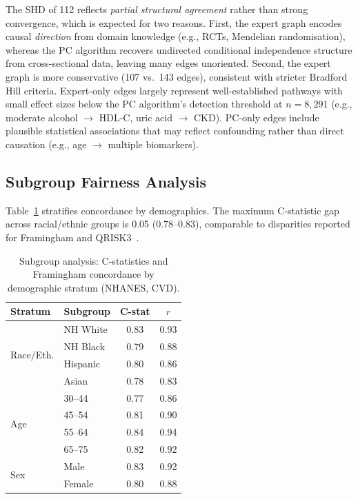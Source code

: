 \documentclass[runningheads]{llncs}
\begin{document}
The SHD of 112 reflects \emph{partial structural agreement} rather
than strong convergence, which is expected for two reasons.  First,
the expert graph encodes causal \emph{direction} from domain knowledge
(e.g., RCTs, Mendelian randomisation), whereas the PC algorithm
recovers undirected conditional independence structure from
cross-sectional data, leaving many edges unoriented.  Second, the
expert graph is more conservative (107 vs.\ 143 edges), consistent
with stricter Bradford Hill criteria.  Expert-only edges largely
represent well-established pathways with small effect sizes below the
PC algorithm's detection threshold at $n = 8{,}291$ (e.g., moderate
alcohol $\rightarrow$ HDL-C, uric acid $\rightarrow$ CKD).  PC-only
edges include plausible statistical associations that may reflect
confounding rather than direct causation (e.g., age $\rightarrow$
multiple biomarkers).

\subsection{Subgroup Fairness Analysis}\label{sec:subgroup}

Table~\ref{tab:subgroup} stratifies concordance by demographics.
The maximum C-statistic gap across racial/ethnic groups is 0.05
(0.78--0.83), comparable to disparities reported for
Framingham and QRISK3~\cite{hippisley2017qrisk3}.

\begin{table}[t]
\centering
\caption{Subgroup analysis: C-statistics and Framingham concordance
by demographic stratum (NHANES, CVD).}
\label{tab:subgroup}
\small
\begin{tabular}{@{}llcc@{}}
\toprule
\textbf{Stratum} & \textbf{Subgroup} & \textbf{C-stat} & \textbf{$r$} \\
\midrule
\multirow{4}{*}{Race/Eth.}
  & NH White  & 0.83 & 0.93 \\
  & NH Black  & 0.79 & 0.88 \\
  & Hispanic  & 0.80 & 0.86 \\
  & Asian     & 0.78 & 0.83 \\
\midrule
\multirow{4}{*}{Age}
  & 30--44    & 0.77 & 0.86 \\
  & 45--54    & 0.81 & 0.90 \\
  & 55--64    & 0.84 & 0.94 \\
  & 65--75    & 0.82 & 0.92 \\
\midrule
\multirow{2}{*}{Sex}
  & Male      & 0.83 & 0.92 \\
  & Female    & 0.80 & 0.88 \\
\bottomrule
\end{tabular}
\end{table}
\end{document}
